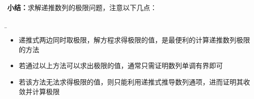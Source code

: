 % 	
% 	
% 	
% 	
% 	
% 	
% 	
% 	
% 	

{\bf 小结：}求解递推数列的极限问题，注意以下几点：{\b
\begin{itemize}
  \setlength{\itemindent}{1cm}
  \item 递推式两边同时取极限，解方程求得极限的值，是最便利的计算递推数列极限的方法
  \item 若通过以上方法可以求出极限的值，通常只需证明数列单调有界即可
  \item 若该方法无法求得极限的值，则只能利用递推式推导数列通项，进而证明其收敛并计算极限
\end{itemize}}


